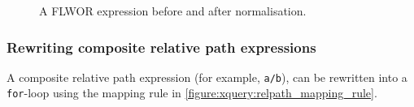 \begin{figure}
\centering
{}
\caption{A FLWOR expression before and after normalisation.}
\end{figure}

\subsubsection{Rewriting composite relative path expressions}
A composite relative path expression (for example, \verb!a/b!), can be
rewritten into a \texttt{for}-loop using the mapping rule in
\ref{figure:xquery:relpath_mapping_rule}.

